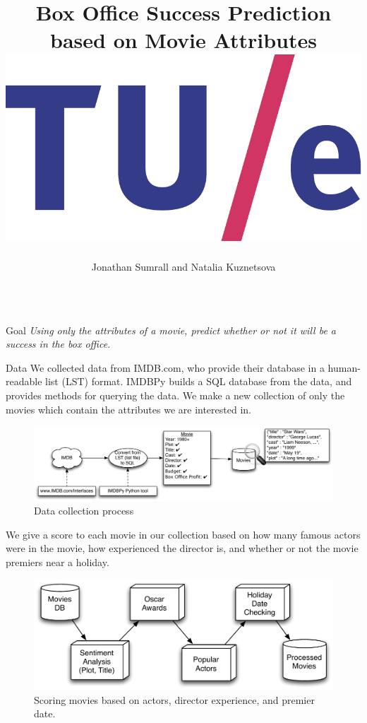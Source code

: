 \documentclass[final,table]{beamer}
\title{ Box Office Success Prediction based on Movie Attributes \hspace{1ex} 
          \includegraphics[width=8ex]{logo.png}}
\author{Jonathan Sumrall and Natalia Kuznetsova } %
\institute{Technical University of Eindhoven} %
\newlength{\twocolwid}
\begin{document}

\setlength{\belowcaptionskip}{2ex} %
\setlength\belowdisplayshortskip{2ex} %

\begin{frame}[t] %

\begin{columns}[t] %




\begin{column}{\twocolwid} %

\begin{block}{Goal}
\centering
\emph{Using only the attributes of a movie, predict whether or not it will be a success in the box office. }
\newline
\end{block}

\begin{block}{Data}
We collected data from IMDB.com, who provide their database in a human-readable list (LST) format. IMDBPy builds a SQL database from the data, and provides methods for querying the data.  We make a new collection of only the movies which contain the attributes we are interested in. 

\begin{figure}
          \includegraphics[width=70ex]{datafigure.pdf}
          \caption{Data collection process}
\end{figure}

We give a score to each movie in our collection based on how many famous actors were in the movie, how experienced the director is, and whether or not the movie premiers near a holiday. 

\begin{figure}
          \includegraphics[width=50ex]{dataProcessingFigure.pdf}
          \caption{Scoring movies based on actors, director experience, and premier date.}
\end{figure}
\end{block}


\end{column}
\end{columns}
\end{frame}
\end{document}

